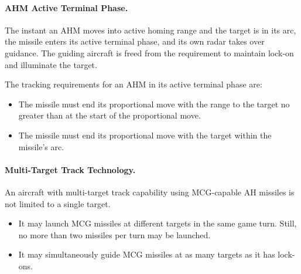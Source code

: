 {\paragraph{AHM Active Terminal Phase.} The instant an AHM moves into active homing range and the target is in its  arc, the missile enters its active terminal phase, and its own radar takes over guidance. The guiding aircraft is freed from the requirement to maintain lock-on and illuminate the target.

The tracking requirements for an AHM in its active terminal phase are:

\begin{itemize}

    \item The missile must end its proportional move with the range to the target no greater than at the start of the proportional move.

    \item The missile must end its proportional move with the target within the missile's  arc.

\end{itemize}

\paragraph{Multi-Target Track Technology.} An aircraft with multi-target track capability using MCG-capable AH missiles is not limited to a single target.

\begin{itemize}

    \item It may launch MCG missiles at different targets in the same game turn. Still, no more than two missiles per turn may be launched.

    \item It may simultaneously guide MCG missiles at as many targets as it has lock-ons.

\end{itemize}

}

